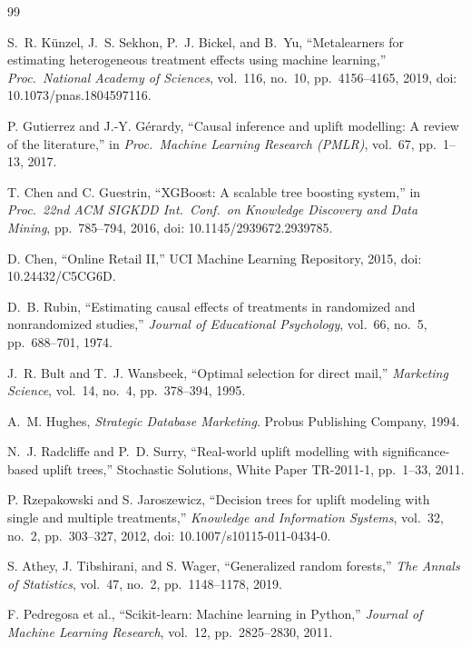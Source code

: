 \documentclass[11pt,a4paper,twoside]{article}
\begin{document}
\begin{thebibliography}{99}
\setlength{\itemsep}{0pt}

S.~R. K{\"u}nzel, J.~S. Sekhon, P.~J. Bickel, and B.~Yu,
``Metalearners for estimating heterogeneous treatment effects using machine learning,''
\emph{Proc.\ National Academy of Sciences}, vol.~116, no.~10, pp.~4156--4165, 2019,
doi: 10.1073/pnas.1804597116.

P. Gutierrez and J.-Y. G{\'e}rardy,
``Causal inference and uplift modelling: A review of the literature,''
in \emph{Proc.\ Machine Learning Research (PMLR)}, vol.~67, pp.~1--13, 2017.

T. Chen and C. Guestrin,
``XGBoost: A scalable tree boosting system,''
in \emph{Proc.\ 22nd ACM SIGKDD Int.\ Conf.\ on Knowledge Discovery and Data Mining}, pp.~785--794, 2016,
doi: 10.1145/2939672.2939785.

D. Chen,
``Online Retail II,''
UCI Machine Learning Repository, 2015,
doi: 10.24432/C5CG6D.

D.~B. Rubin,
``Estimating causal effects of treatments in randomized and nonrandomized studies,''
\emph{Journal of Educational Psychology}, vol.~66, no.~5, pp.~688--701, 1974.

J.~R. Bult and T.~J. Wansbeek,
``Optimal selection for direct mail,''
\emph{Marketing Science}, vol.~14, no.~4, pp.~378--394, 1995.

A.~M. Hughes,
\emph{Strategic Database Marketing}.
Probus Publishing Company, 1994.

N.~J. Radcliffe and P.~D. Surry,
``Real-world uplift modelling with significance-based uplift trees,''
Stochastic Solutions, White Paper TR-2011-1, pp.~1--33, 2011.

P. Rzepakowski and S. Jaroszewicz,
``Decision trees for uplift modeling with single and multiple treatments,''
\emph{Knowledge and Information Systems}, vol.~32, no.~2, pp.~303--327, 2012,
doi: 10.1007/s10115-011-0434-0.

S. Athey, J. Tibshirani, and S. Wager,
``Generalized random forests,''
\emph{The Annals of Statistics}, vol.~47, no.~2, pp.~1148--1178, 2019.

F. Pedregosa et al.,
``Scikit-learn: Machine learning in Python,''
\emph{Journal of Machine Learning Research}, vol.~12, pp.~2825--2830, 2011.

\end{thebibliography}
\endgroup
\end{document}
